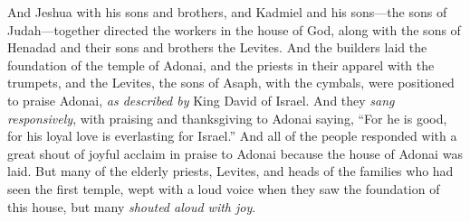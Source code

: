 \begin{biblechapter}
\verse And Jeshua with his sons and brothers, and Kadmiel and his sons—the sons of Judah—together directed the workers in the house of God, along with the sons of Henadad and their sons and brothers the Levites.
\verse And the builders laid the foundation of the temple of Adonai, and the priests in their apparel with the trumpets, and the Levites, the sons of Asaph, with the cymbals, were positioned to praise Adonai, \textit{as described by} King David of Israel.
\verse And they \textit{sang responsively}, with praising and thanksgiving to Adonai saying, “For he is good, for his loyal love is everlasting for Israel.”
\verse And all of the people responded with a great shout of joyful acclaim in praise to Adonai because the house of Adonai was laid.
\verse But many of the elderly priests, Levites, and heads of the families who had seen the first temple, wept with a loud voice when they saw the foundation of this house, but many \textit{shouted aloud with joy}.
\end{biblechapter}

